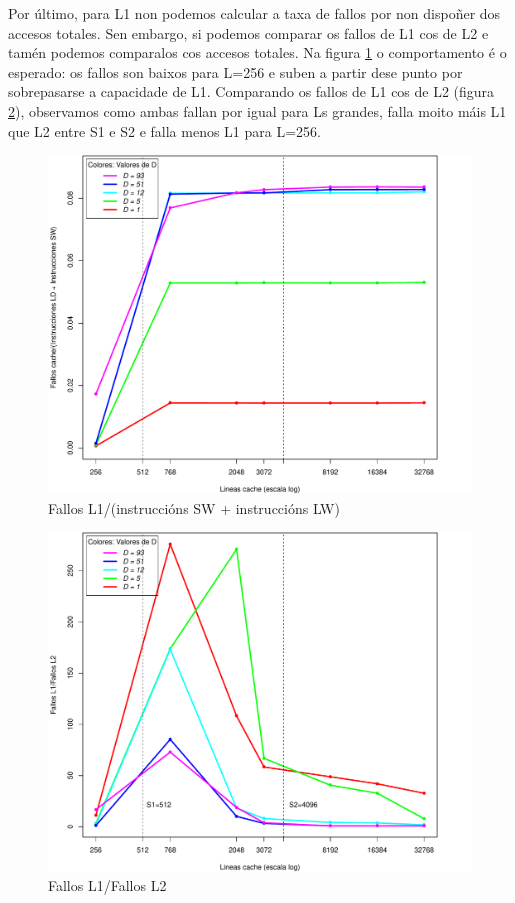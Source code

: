 \documentclass[letterpaper, 10 pt,spanish, conference]{ieeeconf}  %
\begin{document}
Por último, para L1 non podemos calcular a taxa de fallos por non dispoñer dos accesos totales. Sen embargo, si podemos comparar os fallos de L1 cos de L2 e tamén podemos comparalos cos accesos totales. Na figura \ref{fig:papil1t} o comportamento é o esperado: os fallos son baixos para L=256 e suben a partir dese punto por sobrepasarse a capacidade de L1. Comparando os fallos de L1 cos de L2 (figura \ref{fig:papil1l2}), observamos como ambas fallan por igual para Ls grandes, falla moito máis L1 que L2 entre S1 e S2 e falla menos L1 para L=256.

\begin{figure}
    \centering
    \includegraphics[scale=0.38]{L1M-T.pdf}
    \caption{Fallos L1/(instruccións SW + instruccións LW)}
    \label{fig:papil1t}
\end{figure}

\begin{figure}
    \centering
    \includegraphics[scale=0.38]{L1M-L2M.pdf}
    \caption{Fallos L1/Fallos L2}
    \label{fig:papil1l2}
\end{figure}
\end{document}
